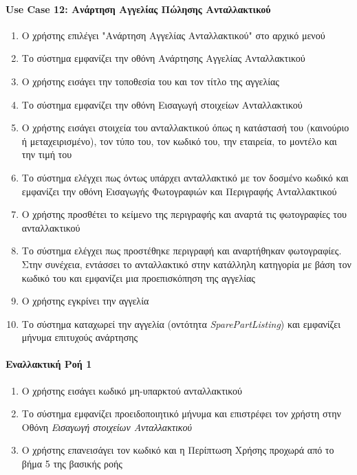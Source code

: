 \documentclass{../ol-softwaremanual}
\begin{document}
	\newpage
	\centering
	\paragraph{\en Use Case 12: \gr Ανάρτηση Αγγελίας Πώλησης Ανταλλακτικού \gr}
	
	\begin{enumerate}
		\item Ο χρήστης επιλέγει \en"\gr Ανάρτηση Αγγελίας Ανταλλακτικού\en" \gr στο αρχικό μενού
		\item Το σύστημα εμφανίζει την οθόνη Ανάρτησης Αγγελίας Ανταλλακτικού
		\item Ο χρήστης εισάγει την τοποθεσία του και τον τίτλο της αγγελίας
		\item Το σύστημα εμφανίζει την οθόνη Εισαγωγή στοιχείων Ανταλλακτικού
		\item Ο χρήστης εισάγει στοιχεία του ανταλλακτικού όπως η κατάστασή του (καινούριο ή μεταχειρισμένο), τον τύπο του, τον κωδικό του, την εταιρεία, το μοντέλο και την τιμή του
		\item Το σύστημα ελέγχει πως όντως υπάρχει ανταλλακτικό με τον δοσμένο κωδικό και εμφανίζει την οθόνη Εισαγωγής Φωτογραφιών και Περιγραφής Ανταλλακτικού
		\item Ο χρήστης προσθέτει το κείμενο της περιγραφής και αναρτά τις φωτογραφίες του ανταλλακτικού
		\item Το σύστημα ελέγχει πως προστέθηκε περιγραφή και αναρτήθηκαν φωτογραφίες. Στην συνέχεια, εντάσσει το ανταλλακτικό στην κατάλληλη κατηγορία με βάση τον κωδικό του και εμφανίζει μια προεπισκόπηση της αγγελίας
		\item Ο χρήστης εγκρίνει την αγγελία
		\item Το σύστημα καταχωρεί την αγγελία (οντότητα \en\textit{SparePartListing}\gr) και εμφανίζει μήνυμα επιτυχούς ανάρτησης
	\end{enumerate}
	
	
	\paragraph{Εναλλακτική Ροή 1}
	
	\begin{enumerate}
		\item Ο χρήστης εισάγει κωδικό μη-υπαρκτού ανταλλακτικού
		\item Το σύστημα εμφανίζει προειδοποιητικό μήνυμα και επιστρέφει τον χρήστη στην Οθόνη \textit{Εισαγωγή στοιχείων Ανταλλακτικού}
		\item Ο χρήστης επανεισάγει τον κωδικό και η Περίπτωση Χρήσης προχωρά από το βήμα 5 της βασικής ροής
	\end{enumerate}
	
\end{document}
